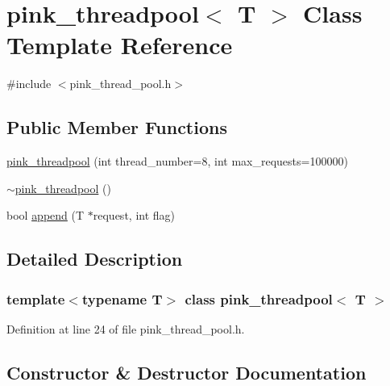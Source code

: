 \hypertarget{classpink__threadpool}{}\section{pink\+\_\+threadpool$<$ T $>$ Class Template Reference}
\label{classpink__threadpool}


{\ttfamily \#include $<$pink\+\_\+thread\+\_\+pool.\+h$>$}

\subsection*{Public Member Functions}
\begin{DoxyCompactItemize}
\item 
\hyperlink{classpink__threadpool_a75dcfa67e83f32078d65f263cae5b118}{pink\+\_\+threadpool} (int thread\+\_\+number=8, int max\+\_\+requests=100000)
\item 
\hyperlink{classpink__threadpool_a6656ad18ca5a114c6dbd0e5c605bc65c}{$\sim$pink\+\_\+threadpool} ()
\item 
bool \hyperlink{classpink__threadpool_ae4bead5c98203b97c3caeae43296d295}{append} (T $\ast$request, int flag)
\end{DoxyCompactItemize}


\subsection{Detailed Description}
\subsubsection*{template$<$typename T$>$\newline
class pink\+\_\+threadpool$<$ T $>$}



Definition at line 24 of file pink\+\_\+thread\+\_\+pool.\+h.



\subsection{Constructor \& Destructor Documentation}
\mbox{\label{classpink__threadpool_a75dcfa67e83f32078d65f263cae5b118}} 
